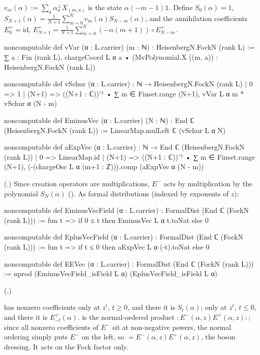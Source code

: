 \begin{definition}\label{ch03:def:vSchur}
$v_m(\alpha):=\sum_a\alpha^\perp_aX_{(m,a)}$ is the state $\alpha(-m-1)\mathbb 1$. Define
$S_0(\alpha)=1$, $S_{N+1}(\alpha)=\frac1{N+1}\sum_{m=0}^{N}v_m(\alpha)S_{N-m}(\alpha)$, and the
annihilation coefficients $E^+_0=\mathrm{id}$,
$E^+_{N+1}=\frac{1}{N+1}\sum_{m=0}^N(-\alpha(m+1))\circ E^+_{N-m}$.
\end{definition}
\begin{leancode}
noncomputable def vVar (α : L.carrier) (m : ℕ) : HeisenbergN.FockN (rank L) :=
  ∑ a : Fin (rank L), chargeCoord L α a • (MvPolynomial.X ((m, a)) : HeisenbergN.FockN (rank L))

noncomputable def vSchur (α : L.carrier) : ℕ → HeisenbergN.FockN (rank L)
  | 0 => 1
  | (N+1) => ((N+1 : ℂ))⁻¹ • ∑ m ∈ Finset.range (N+1), vVar L α m * vSchur α (N - m)

noncomputable def EminusVec (α : L.carrier) (N : ℕ) : End ℂ (HeisenbergN.FockN (rank L)) :=
  LinearMap.mulLeft ℂ (vSchur L α N)

noncomputable def aExpVec (α : L.carrier) : ℕ → End ℂ (HeisenbergN.FockN (rank L))
  | 0 => LinearMap.id
  | (N+1) => ((N+1 : ℂ))⁻¹ • ∑ m ∈ Finset.range (N+1),
      (-(chargeOsc L α (m+1 : ℤ))).comp (aExpVec α (N - m))
\end{leancode}
(.) Since creation operators are
multiplications, $E^-$ acts by multiplication by the polynomial $S_N(\alpha)$
(). As formal distributions (indexed by exponents of $z$):
\begin{leancode}
noncomputable def EminusVecField (α : L.carrier) : FormalDist (End ℂ (FockN (rank L))) :=
  fun t => if 0 ≤ t then EminusVec L α t.toNat else 0

noncomputable def EplusVecField (α : L.carrier) : FormalDist (End ℂ (FockN (rank L))) :=
  fun t => if t ≤ 0 then aExpVec L α (-t).toNat else 0

noncomputable def EEVec (α : L.carrier) : FormalDist (End ℂ (FockN (rank L))) :=
  nprod (EminusVecField_isField L α) (EplusVecField_isField L α)
\end{leancode}
(.)

\begin{dictionary}
 has nonzero coefficients only at $z^t$, $t\ge0$, and there it is
$S_t(\alpha)$;  only at $z^t$, $t\le0$, and there it is $E^+_{-t}(\alpha)$.
 is the normal-ordered product ${:}E^-(\alpha,z)E^+(\alpha,z){:}$; since all
nonzero coefficients of $E^-$ sit at non-negative powers, the normal ordering simply puts $E^-$ on
the left, so  $=E^-(\alpha,z)E^+(\alpha,z)$, the boson dressing. It acts on the Fock
factor only.
\end{dictionary}

